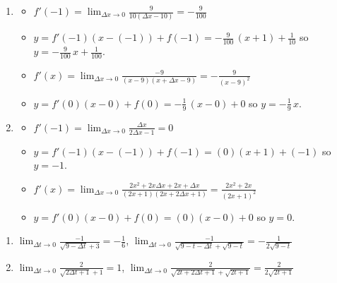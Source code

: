 \documentclass{ximera}
\begin{document}
\begin{enumerate}
\setcounter{enumi}{\value{HW}}

\item   \begin{itemize}

\item  $f'(-1) = \lim_{\Delta x \rightarrow 0} \frac{9}{10(\Delta x - 10)} = -\frac{9}{100}$

\smallskip

\item $y = f'(-1)(x-(-1)) + f(-1) = -\frac{9}{100} \, (x+1) + \frac{1}{10}$ so $y = - \frac{9}{100} \, x + \frac{1}{100}$.

\smallskip

\item  $f'(x) =\lim_{\Delta x \rightarrow 0} \frac{-9}{(x - 9)(x + \Delta x - 9)} =   -\frac{9}{(x-9)^2}$   

\smallskip  

\item  $y = f'(0)(x-0) + f(0) = -\frac{1}{9} \, (x-0)+0$ so $y = -\frac{1}{9} \, x$.

\smallskip

\end{itemize}

\item \begin{itemize}  

\item  $f'(-1) = \lim_{\Delta x \rightarrow 0} \frac{\Delta x}{2 \Delta x - 1} = 0$

\smallskip

\item $y = f'(-1)(x-(-1)) + f(-1) = (0) (x+1) + (-1)$ so $y = -1$.

\smallskip

\item  $f'(x) =\lim_{\Delta x \rightarrow 0}\frac{2x^2+2x\Delta x+2x+\Delta x}{(2x+1)(2x+2\Delta x+1)}=  \frac{2x^2+2x}{(2x+1)^2}$

\smallskip

\item  $y = f'(0)(x-0) + f(0) = (0)(x-0)+0$ so $y = 0$.

\smallskip

\end{itemize}


\setcounter{HW}{\value{enumi}}
\end{enumerate}

\begin{enumerate}
\setcounter{enumi}{\value{HW}}

\item  $\lim_{\Delta t \rightarrow 0}\frac{-1}{\sqrt{9-\Delta t} +3}  = -\frac{1}{6}$,   $\lim_{\Delta t \rightarrow 0} \frac{-1}{\sqrt{9-t-\Delta t} + \sqrt{9-t}}=   -\frac{1}{2 \sqrt{9-t}}$   
\item  $\lim_{\Delta t \rightarrow 0}\frac{2}{\sqrt{2\Delta t+1} + 1}  =1$,   $\lim_{\Delta t \rightarrow 0}\frac{2}{\sqrt{2t+2\Delta t+1} + \sqrt{2t+1}}=   \frac{2}{2 \sqrt{2t+1}}$    

\setcounter{HW}{\value{enumi}}
\end{enumerate}
\end{document}
